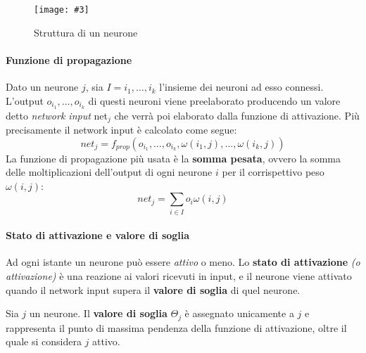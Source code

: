 \documentclass[12pt, twoside, letterpaper]{report}
\newcommand{\img}[4] {
	\begin{figure}
		\centering
		\texttt{[image: \#3]}\\
		\caption{#1}
		\label{fig:#4}
	\end{figure}
}
\begin{document}
			\img{Struttura di un neurone \cite{kriesel}}{0.4}{neurone.png}{neurone} 
			
			 \paragraph{Funzione di propagazione} Dato un neurone $j$, sia $I = i_1, \dots, i_k$ l'insieme dei neuroni ad esso connessi. L'output $o_{i_1}, \dots, o_{i_k}$ di questi neuroni viene preelaborato producendo un valore detto \textit{network input} net$_j$  che verrà poi elaborato dalla funzione di attivazione. Più precisamente il network input è calcolato come segue: $$net_j = f_{prop}(o_{i_1}, \dots, o_{i_k}, \omega(i_1,j), \dots, \omega(i_k,j))$$
			 	La funzione di propagazione più usata è la \textbf{somma pesata}, ovvero la somma delle moltiplicazioni dell'output di ogni neurone $i$ per il corrispettivo peso $\omega(i,j)$: $$net_j = \sum_{i \in I} o_i \omega(i,j)$$
			 	
			 \paragraph{Stato di attivazione e valore di soglia} Ad ogni istante un neurone può essere \textit{attivo} o meno. Lo \textbf{stato di attivazione} \textit{(o attivazione)} è una reazione ai valori ricevuti in input, e il neurone viene attivato quando il network input supera il \textbf{valore di soglia} di quel neurone. 
			 
			 Sia $j$ un neurone. Il \textbf{valore di soglia} $\Theta_j$ è assegnato unicamente a $j$ e rappresenta il punto di massima pendenza della funzione di attivazione, oltre il quale si considera $j$ attivo.
			 
			 
\end{document}
